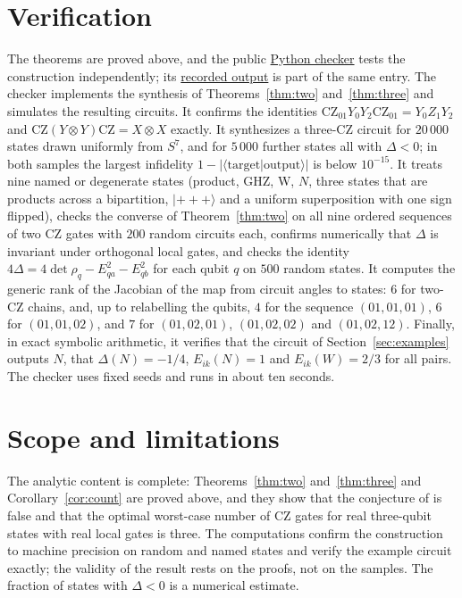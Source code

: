 \documentclass[11pt,a4paper]{article}
\theoremstyle{definition}
\theoremstyle{plain}
\newcommand{\ket}[1]{\lvert#1\rangle}
\newcommand{\braket}[2]{\langle#1\vert#2\rangle}
\newcommand{\CZ}{\mathrm{CZ}}
\begin{document}
\section{Verification}\label{sec:verification}
The theorems are proved above, and the public
\href{https://github.com/jpbruneton/open_quantum_problems/blob/main/research/entries/real-three-qubit-states-three-cz/checks/verify_three_cz.py}{Python checker}
tests the construction independently; its
\href{https://github.com/jpbruneton/open_quantum_problems/blob/main/research/entries/real-three-qubit-states-three-cz/data/verification.json}{recorded output}
is part of the same entry. The checker implements the synthesis of
Theorems~\ref{thm:two} and~\ref{thm:three} and simulates the resulting circuits.
It confirms the identities $\CZ_{01}Y_0Y_2\CZ_{01}=Y_0Z_1Y_2$ and
$\CZ(Y\otimes Y)\CZ=X\otimes X$ exactly. It synthesizes a three-CZ circuit for
$20\,000$ states drawn uniformly from $S^7$, and for $5\,000$ further states
all with $\Delta<0$; in both samples the largest infidelity
$1-\lvert\braket{\text{target}}{\text{output}}\rvert$ is below $10^{-15}$. It
treats nine named or degenerate states (product, GHZ, W, $N$, three states
that are products across a bipartition, $\ket{{+}{+}{+}}$ and a uniform
superposition with one sign flipped), checks the converse of
Theorem~\ref{thm:two} on all nine ordered sequences of two CZ gates with
$200$ random circuits each, confirms numerically that $\Delta$ is
invariant under orthogonal local gates, and checks the identity
$4\Delta=4\det\rho_q-E_{qa}^2-E_{qb}^2$ for each qubit $q$ on $500$ random
states. It computes the generic rank of the
Jacobian of the map from circuit angles to states: $6$ for two-CZ chains, and,
up to relabelling the qubits, $4$ for the sequence $(01,01,01)$, $6$ for
$(01,01,02)$, and $7$ for $(01,02,01)$, $(01,02,02)$ and $(01,02,12)$. Finally,
in exact symbolic arithmetic, it verifies that the circuit of
Section~\ref{sec:examples} outputs $N$, that $\Delta(N)=-1/4$,
$E_{ik}(N)=1$ and $E_{ik}(W)=2/3$ for all pairs. The checker uses fixed seeds
and runs in about ten seconds.

\section{Scope and limitations}\label{sec:scope}
The analytic content is complete: Theorems~\ref{thm:two} and~\ref{thm:three}
and Corollary~\ref{cor:count} are proved above, and they show that the
conjecture of \cite{Perdomo2022} is false and that the optimal worst-case
number of CZ gates for real three-qubit states with real local gates is three.
The computations confirm the construction to machine precision on random and
named states and verify the example circuit exactly; the validity of the
result rests on the proofs, not on the samples. The fraction of states with
$\Delta<0$ is a numerical estimate.
\end{document}
